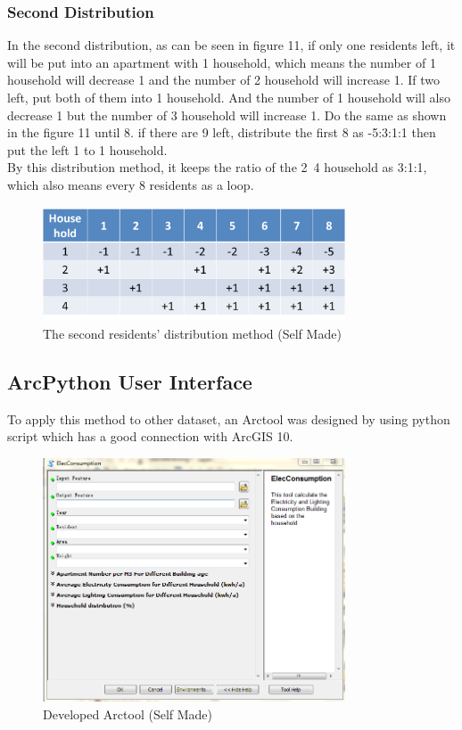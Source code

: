 \documentclass[11pt]{article}
\begin{document}
\subsubsection{Second Distribution}
In the second distribution, as can be seen in figure 11, if only one residents left, it will be put into an apartment with 1 household, which means the number of 1 household will decrease 1 and the number of 2 household will increase 1. If two left, put both of them into 1 household. And the number of 1 household will also decrease 1 but the number of 3 household will increase 1. Do the same as shown in the figure 11 until 8. if there are 9 left, distribute the first 8 as -5:3:1:1 then put the left 1 to 1 household. \\
By this distribution method, it keeps the ratio of the 2~4 household as 3:1:1, which also means every 8 residents as a loop. 


\begin{figure}[H]
	\centering
	\includegraphics[width=0.8\textwidth]{fig12.png}
	\caption{The second residents’ distribution method (Self Made)}
	\label{fig:figure12}
\end{figure}

\subsection{ArcPython User Interface}

To apply this method to other dataset, an Arctool was designed by using python script which has a good connection with ArcGIS 10. 

\begin{figure}[ht]
	\centering
	\includegraphics[width=0.8\textwidth]{fig13.png}
	\caption{Developed Arctool (Self Made)}
	\label{fig:figure13}
\end{figure}
\end{document}
